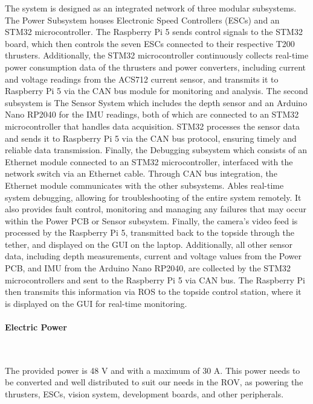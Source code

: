 \begin{enumerate}[label=(\roman*), leftmargin=0pt, itemindent=20pt]
    \vspace{-0.2cm}
    The system is designed as an integrated network of three modular subsystems. The Power Subsystem houses Electronic Speed Controllers (ESCs) and an STM32 microcontroller. The Raspberry Pi 5 sends control signals to the STM32 board, which then controls the seven ESCs connected to their respective T200 thrusters. Additionally, the STM32 microcontroller continuously collects real-time power consumption data of the thrusters and power converters, including current and voltage readings from the ACS712 current sensor, and transmits it to Raspberry Pi 5 via the CAN bus module for monitoring and analysis. The second subsystem is The Sensor System which includes the depth sensor and an Arduino Nano RP2040 for the IMU readings, both of which are connected to an STM32 microcontroller that handles data acquisition. STM32 processes the sensor data and sends it to Raspberry Pi 5 via the CAN bus protocol, ensuring timely and reliable data transmission. Finally, the Debugging subsystem which consists of an Ethernet module connected to an STM32 microcontroller, interfaced with the network switch via an Ethernet cable. Through CAN bus integration, the Ethernet module communicates with the other subsystems. Ables real-time system debugging, allowing for troubleshooting of the entire system remotely. It also provides fault control, monitoring and managing any failures that may occur within the Power PCB or Sensor subsystem. Finally, the camera’s video feed is processed by the Raspberry Pi 5, transmitted back to the topside through the tether, and displayed on the GUI on the laptop. Additionally, all other sensor data, including depth measurements, current and voltage values from the Power PCB, and IMU from the Arduino Nano RP2040, are collected by the STM32 microcontrollers and sent to the Raspberry Pi 5 via CAN bus. The Raspberry Pi then transmits this information via ROS to the topside control station, where it is displayed on the GUI for real-time monitoring.

\end{enumerate}

\paragraph{Electric Power} \ \\
\vspace{-0.5cm}

The provided power is 48 V and with a maximum of 30 A. This power needs to be converted and well distributed to suit our needs in the ROV, as powering the thrusters, ESCs, vision system, development boards, and other peripherals.

